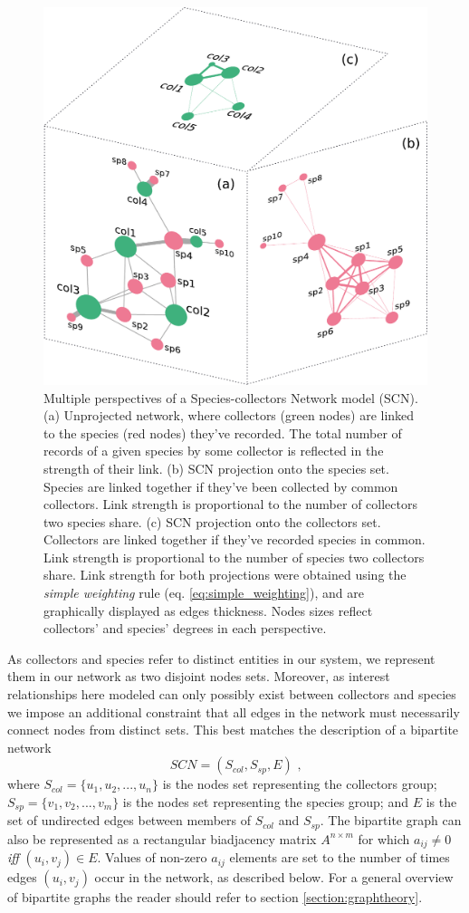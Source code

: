 {  \begin{figure}[h!]
  	\centering
    \includegraphics[width=.7\linewidth]{figures/network_models/scn_generalaspect.pdf}
    \caption{Multiple perspectives of a Species-collectors Network model (SCN).
    (a) Unprojected network, where collectors (green nodes) are linked to the species (red nodes) they've recorded. The total number of records of a given species by some collector is reflected in the strength of their link. (b) SCN projection onto the species set. Species are linked together if they've been collected by common collectors. Link strength is proportional to the number of collectors two species share. (c) SCN projection onto the collectors set. Collectors are linked together if they've recorded species in common. Link strength is proportional to the number of species two collectors share. 
    Link strength for both projections were obtained using the \textit{simple weighting} rule (eq. \ref{eq:simple_weighting}), and are graphically displayed as edges thickness. Nodes sizes reflect collectors' and species' degrees in each perspective.}
    \label{fig:scn_general}
  \end{figure}
  
As collectors and species refer to distinct entities in our system, we represent them in our network as two disjoint nodes sets.
Moreover, as interest relationships here modeled can only possibly exist between collectors and species we impose an additional constraint that all edges in the network must necessarily connect nodes from distinct sets.
This best matches the description of a bipartite network
$$ SCN = (S_{col},S_{sp},E) \mbox{ ,}$$
where $S_{col} = \{u_1, u_2, ..., u_n \}$ is the nodes set representing the collectors group; $S_{sp}=\{v_1,v_2, ..., v_m\}$ is the nodes set representing the species group; and $E$ is the set of undirected edges between members of $S_{col}$ and $S_{sp}$.
The bipartite graph can also be represented as a rectangular biadjacency matrix $A^{n\times m}$ for which $a_{ij}\neq 0$ \textit{iff} $(u_i,v_j) \in E$. Values of non-zero $a_{ij}$ elements are set to the number of times edges $(u_i,v_j)$ occur in the network, as described below. 
For a general overview of bipartite graphs the reader should refer to section \ref{section:graphtheory}.

}
